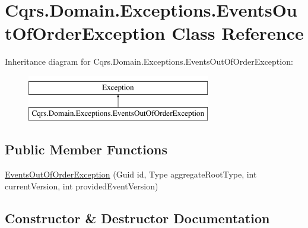\hypertarget{classCqrs_1_1Domain_1_1Exceptions_1_1EventsOutOfOrderException}{}\section{Cqrs.\+Domain.\+Exceptions.\+Events\+Out\+Of\+Order\+Exception Class Reference}
\label{classCqrs_1_1Domain_1_1Exceptions_1_1EventsOutOfOrderException}
Inheritance diagram for Cqrs.\+Domain.\+Exceptions.\+Events\+Out\+Of\+Order\+Exception\+:\begin{figure}[H]
\begin{center}
\leavevmode
\includegraphics[height=2.000000cm]{classCqrs_1_1Domain_1_1Exceptions_1_1EventsOutOfOrderException}
\end{center}
\end{figure}
\subsection*{Public Member Functions}
\begin{DoxyCompactItemize}
\item 
\hyperlink{classCqrs_1_1Domain_1_1Exceptions_1_1EventsOutOfOrderException_a9a310b697aa5f2bfaefd7511aca6e808_a9a310b697aa5f2bfaefd7511aca6e808}{Events\+Out\+Of\+Order\+Exception} (Guid id, Type aggregate\+Root\+Type, int current\+Version, int provided\+Event\+Version)
\end{DoxyCompactItemize}


\subsection{Constructor \& Destructor Documentation}
\mbox{\label{classCqrs_1_1Domain_1_1Exceptions_1_1EventsOutOfOrderException_a9a310b697aa5f2bfaefd7511aca6e808_a9a310b697aa5f2bfaefd7511aca6e808}} 
